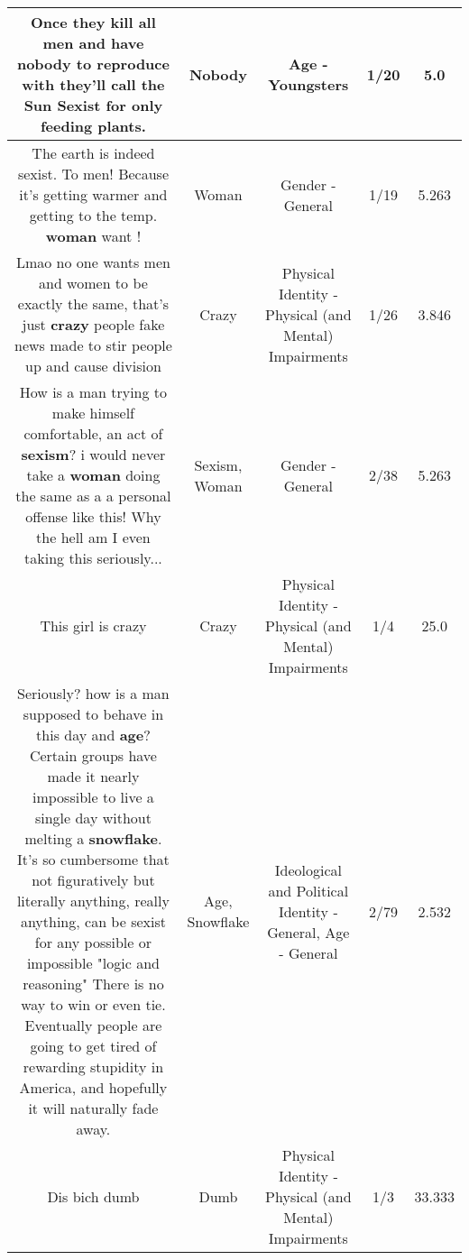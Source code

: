 \documentclass[11pt]{article}
\newlength\mylength
\begin{document}
\begin{center}
\begin{longtable}{|C{.65\mylength}|C{.30\mylength}|C{.12\mylength}|C{.12\mylength}|C{.12\mylength}|}
  \small Once they kill all men and have \textbf{nobody} to reproduce with they'll call the Sun Sexist for only feeding plants.\normalsize   & Nobody & Age - Youngsters & 1/20 & 5.0 \\  \hline
  \small The earth is indeed sexist. To men! Because it's getting warmer and getting to the temp. \textbf{woman} want !\normalsize   & Woman & Gender - General & 1/19 & 5.263 \\  \hline
  \small Lmao no one wants men and women to be exactly the same, that's just \textbf{crazy} people fake news made to stir people up and cause division\normalsize   & Crazy & Physical Identity - Physical (and Mental) Impairments & 1/26 & 3.846 \\  \hline
  \small How is a man trying to make himself comfortable, an act of \textbf{sexism}? i would never take a \textbf{woman} doing the same as a a personal offense like this! Why the hell am I even taking this seriously...\normalsize   & Sexism, Woman & Gender - General & 2/38 & 5.263 \\  \hline
  \small This girl is crazy\normalsize   & Crazy & Physical Identity - Physical (and Mental) Impairments & 1/4 & 25.0 \\  \hline
  \small Seriously? how is a man supposed to behave in this day and \textbf{age}? Certain groups have made it nearly impossible to live a single day without melting a \textbf{snowflake}. It's so cumbersome that not figuratively but literally anything, really anything, can be sexist for any possible or impossible "logic and reasoning"  There is no way to win or even tie. Eventually people are going to get tired of rewarding stupidity in America, and hopefully it will naturally fade away.\normalsize   & Age, Snowflake &  Ideological and Political Identity - General, Age - General & 2/79 & 2.532 \\  \hline
  \small Dis bich dumb\normalsize   & Dumb & Physical Identity - Physical (and Mental) Impairments & 1/3 & 33.333 \\  \hline

\end{longtable}
\end{center}
\end{document}
